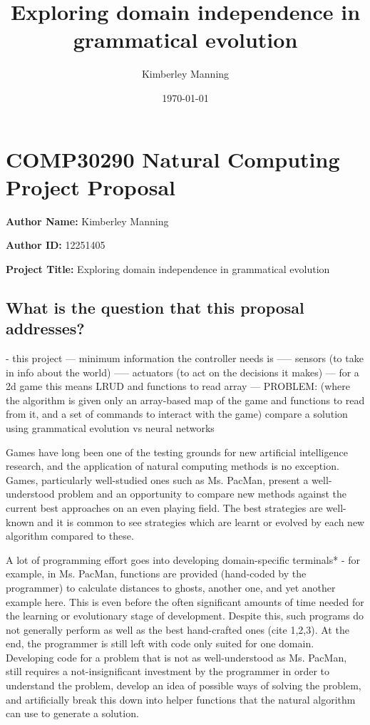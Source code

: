 \documentclass[a4paper,12pt]{article}
\begin{document}
\title{Exploring domain independence in grammatical evolution}
\author{Kimberley Manning}
\date{\today}
\newpage

\section*{COMP30290 Natural Computing Project Proposal}

\textbf{Author Name:} Kimberley Manning

\textbf{Author ID:} 12251405

\textbf{Project Title:} Exploring domain independence in grammatical evolution

\subsection*{What is the question that this proposal addresses?}

- this project
--- minimum information the controller needs is
----- sensors (to take in info about the world)
----- actuators (to act on the decisions it makes)
--- for a 2d game this means LRUD and functions to read array
--- PROBLEM: (where the algorithm is given only an array-based map of the game and functions to read from it, and a set of commands to interact with the game) compare a solution using grammatical evolution vs neural networks

Games have long been one of the testing grounds for new artificial intelligence research, and the application of natural computing methods is no exception.  Games, particularly well-studied ones such as Ms. PacMan, present a well-understood problem and an opportunity to compare new methods against the current best approaches on an even playing field.  The best strategies are well-known and it is common to see strategies which are learnt or evolved by each new algorithm compared to these.

A lot of programming effort goes into developing domain-specific terminals* - for example, in Ms. PacMan, functions are provided (hand-coded by the programmer) to calculate distances to ghosts, another one, and yet another example here.  This is even before the often significant amounts of time needed for the learning or evolutionary stage of development.  Despite this, such programs do not generally perform as well as the best hand-crafted ones (cite 1,2,3).  At the end, the programmer is still left with code only suited for one domain. Developing code for a problem that is not as well-understood as Ms. PacMan, still requires a not-insignificant investment by the programmer in order to understand the problem, develop an idea of possible ways of solving the problem, and artificially break this down into helper functions that the natural algorithm can use to generate a solution.
\end{document}
